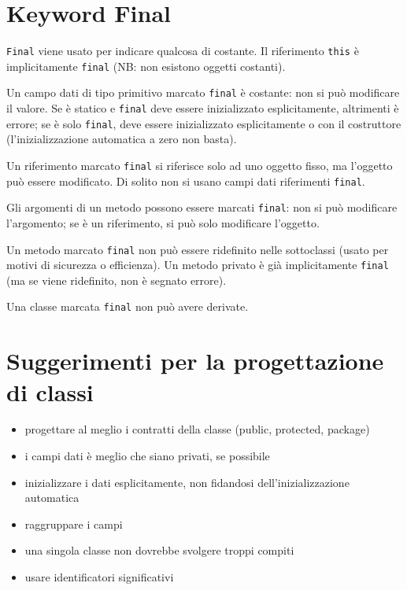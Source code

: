 \section{Keyword Final} %
\texttt{Final} viene usato per indicare qualcosa di costante. Il riferimento \texttt{this} è implicitamente \texttt{final} (NB: non esistono oggetti costanti).

Un campo dati di tipo primitivo marcato \texttt{final} è costante: non si può modificare il valore. Se è  statico e \texttt{final} deve essere inizializzato esplicitamente, altrimenti è errore; se è solo \texttt{final}, deve essere inizializzato esplicitamente o con il costruttore (l'inizializzazione automatica a zero non basta).

Un riferimento marcato \texttt{final} si riferisce solo ad uno oggetto fisso, ma l'oggetto può essere modificato. Di solito non si usano campi dati riferimenti \texttt{final}.

Gli argomenti di un metodo possono essere marcati \texttt{final}: non si può modificare l'argomento; se è un riferimento, si può solo modificare l'oggetto.

Un metodo marcato \texttt{final} non può essere ridefinito nelle sottoclassi (usato per motivi di sicurezza o efficienza). Un metodo privato è già implicitamente \texttt{final} (ma se viene ridefinito, non è segnato errore).

Una classe marcata \texttt{final} non può avere derivate.

\section{Suggerimenti per la progettazione di classi} %
\begin{itemize}
\item progettare al meglio i contratti della classe (public, protected, package)
\item i campi dati è meglio che siano privati, se possibile
\item inizializzare i dati esplicitamente, non fidandosi dell'inizializzazione automatica
\item raggruppare i campi
\item una singola classe non dovrebbe svolgere troppi compiti
\item usare identificatori significativi
\end{itemize}

